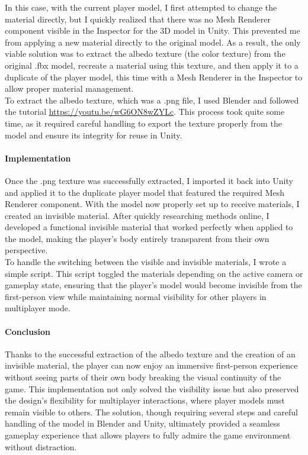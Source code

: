 \documentclass{article}
\begin{document}
In this case, with the current player model, I first attempted to change the material directly, but I quickly realized that there was no Mesh Renderer component visible in the Inspector for the 3D model in Unity. This prevented me from applying a new material directly to the original model. As a result, the only viable solution was to extract the albedo texture (the color texture) from the original .fbx model, recreate a material using this texture, and then apply it to a duplicate of the player model, this time with a Mesh Renderer in the Inspector to allow proper material management.\\

To extract the albedo texture, which was a .png file, I used Blender and followed the tutorial \url{https://youtu.be/wG6ON8wZYLc}. This process took quite some time, as it required careful handling to export the texture properly from the model and ensure its integrity for reuse in Unity.

\paragraph{Implementation}\hfill

Once the .png texture was successfully extracted, I imported it back into Unity and applied it to the duplicate player model that featured the required Mesh Renderer component. With the model now properly set up to receive materials, I created an invisible material. After quickly researching methods online, I developed a functional invisible material that worked perfectly when applied to the model, making the player's body entirely transparent from their own perspective.\\

To handle the switching between the visible and invisible materials, I wrote a simple script. This script toggled the materials depending on the active camera or gameplay state, ensuring that the player's model would become invisible from the first-person view while maintaining normal visibility for other players in multiplayer mode.

\paragraph{Conclusion}\hfill

Thanks to the successful extraction of the albedo texture and the creation of an invisible material, the player can now enjoy an immersive first-person experience without seeing parts of their own body breaking the visual continuity of the game. This implementation not only solved the visibility issue but also preserved the design's flexibility for multiplayer interactions, where player models must remain visible to others. The solution, though requiring several steps and careful handling of the model in Blender and Unity, ultimately provided a seamless gameplay experience that allows players to fully admire the game environment without distraction.
\end{document}
